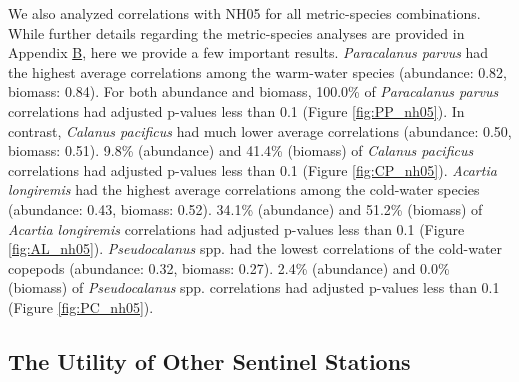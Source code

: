 \documentclass[preprint, authoryear, 12pt]{elsarticle}
\begin{document}
We also analyzed correlations with NH05 for all metric-species combinations. While further details regarding the metric-species analyses are provided in Appendix \hyperlink{appendixB}{B}, here we provide a few important results. \textit{Paracalanus parvus} had the highest average correlations among the warm-water species (abundance: 0.82, biomass: 0.84). For both abundance and biomass, 100.0\% of \textit{Paracalanus parvus} correlations had adjusted p-values less than 0.1 (Figure \ref{fig:PP_nh05}). In contrast, \textit{Calanus pacificus} had much lower average correlations (abundance: 0.50, biomass: 0.51). 9.8\% (abundance) and 41.4\% (biomass) of \textit{Calanus pacificus} correlations had adjusted p-values less than 0.1 (Figure \ref{fig:CP_nh05}).  \textit{Acartia longiremis} had the highest average correlations among the cold-water species (abundance: 0.43, biomass: 0.52). 34.1\% (abundance) and 51.2\% (biomass) of \textit{Acartia longiremis} correlations had adjusted p-values less than 0.1 (Figure \ref{fig:AL_nh05}). \textit{Pseudocalanus} spp. had the lowest correlations of the cold-water copepods (abundance: 0.32, biomass: 0.27). 2.4\% (abundance) and 0.0\% (biomass) of \textit{Pseudocalanus} spp. correlations had adjusted p-values less than 0.1 (Figure \ref{fig:PC_nh05}).  

\subsection{The Utility of Other Sentinel Stations}
\end{document}
